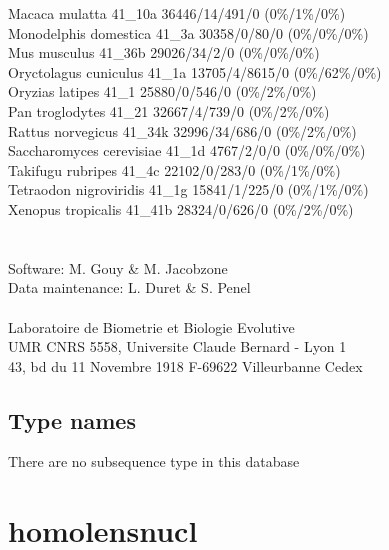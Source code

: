\documentclass{article}
\begin{document}
\begin{Schunk}
Macaca mulatta                          41\_10a 36446/14/491/0 (0\%/1\%/0\%)\\
Monodelphis domestica                   41\_3a 30358/0/80/0 (0\%/0\%/0\%)\\
Mus musculus                            41\_36b 29026/34/2/0 (0\%/0\%/0\%)\\
Oryctolagus cuniculus                   41\_1a 13705/4/8615/0 (0\%/62\%/0\%)\\
Oryzias latipes                         41\_1 25880/0/546/0 (0\%/2\%/0\%)\\
Pan troglodytes                         41\_21 32667/4/739/0 (0\%/2\%/0\%)\\
Rattus norvegicus                       41\_34k 32996/34/686/0 (0\%/2\%/0\%)\\
Saccharomyces cerevisiae                41\_1d 4767/2/0/0 (0\%/0\%/0\%)\\
Takifugu rubripes                       41\_4c 22102/0/283/0 (0\%/1\%/0\%)\\
Tetraodon nigroviridis                  41\_1g 15841/1/225/0 (0\%/1\%/0\%)\\
Xenopus tropicalis                      41\_41b 28324/0/626/0 (0\%/2\%/0\%)\\
 \\
	     \\
Software: M. Gouy \& M. Jacobzone\\
Data maintenance: L. Duret \& S. Penel\\
\\
Laboratoire de Biometrie et Biologie Evolutive\\
UMR CNRS 5558, Universite Claude Bernard - Lyon 1 \\
43, bd du 11 Novembre 1918 F-69622 Villeurbanne Cedex\\


\subsection{Type names}
There are no subsequence type in this database
\section{ homolensnucl }

\end{Schunk}
\end{document}
